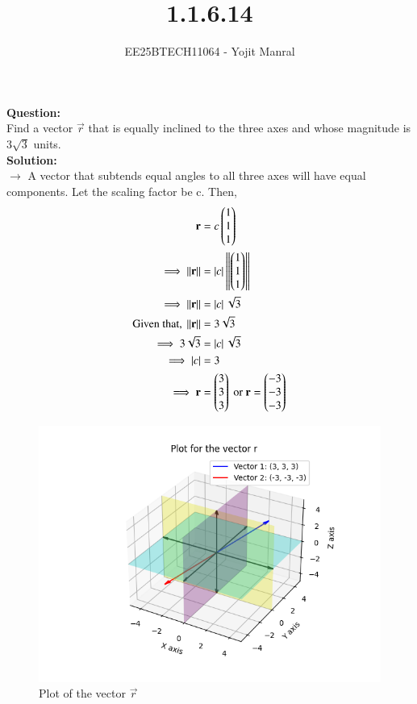 \documentclass[journal]{IEEEtran}
\begin{document}

\vspace{3cm}

\title{1.1.6.14}
\author{EE25BTECH11064 - Yojit Manral}

\maketitle
{\let\newpage\relax\maketitle}
\renewcommand{\thefigure}{\theenumi}
\renewcommand{\thetable}{\theenumi}
\setlength{\intextsep}{10pt} %

\textbf{Question:}\\
Find a vector $\vec{r}$ that is equally inclined to the three axes and whose magnitude is $3\sqrt{3}$ units. \\

\textbf{Solution:}\\
$\rightarrow$ A vector that subtends equal angles to all three axes will have equal components. Let the scaling factor be c. Then,\\

\begin{align}
	\mathbf{r} &= c\begin{pmatrix}1\\1\\1\end{pmatrix} \\
	\implies \left\lVert\mathbf{r}\right\rVert &= \left\vert c\right\vert\left\lVert\begin{pmatrix}1\\1\\1\end{pmatrix}\right\rVert \\
	\implies \left\lVert\mathbf{r}\right\rVert &= \left\vert c\right\vert\sqrt{3} \\
    \text{Given that, } \left\lVert\mathbf{r}\right\rVert &= 3\sqrt{3} \\
	\implies 3\sqrt{3} &= \left\vert c\right\vert\sqrt{3}\\
	\implies \left\vert c\right\vert &= 3\\
    \implies \mathbf{r}&=\begin{pmatrix}3\\3\\3\end{pmatrix} \text{ or } \mathbf{r}=\begin{pmatrix}-3\\-3\\-3\end{pmatrix}
\end{align}

\begin{figure}[h!]
   \centering
   \includegraphics[width=0.8\columnwidth]{figs/01.png}
   \caption{Plot of the vector $\vec{r}$}
   \label{Plot_1}
\end{figure}
\end{document}
